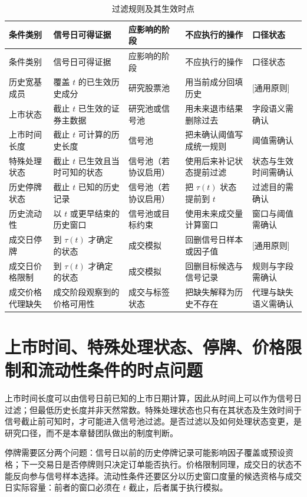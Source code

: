{
\setlength{\tabcolsep}{3.2pt}
\small
\begin{longtable}{p{2.35cm} p{2.75cm} p{2.65cm} p{2.8cm} p{3.55cm}}
\caption{过滤规则及其生效时点}\label{tab:ch03-filter-timing}\\
\toprule
条件类别 & 信号日可得证据 & 应影响的阶段 & 不应执行的操作 & 口径状态 \\
\midrule
\endfirsthead
\toprule
条件类别 & 信号日可得证据 & 应影响的阶段 & 不应执行的操作 & 口径状态 \\
\midrule
\endhead
历史宽基成员 & 覆盖 \(t\) 的已生效历史成分 & 研究股票池 & 用当前成分回填历史 & [通用原则] \\
上市状态 & 截止 \(t\) 已生效的证券主数据 & 研究池或信号池 & 用未来退市结果删除过去 & 字段语义需确认 \\
上市时间长度 & 截止 \(t\) 可计算的历史长度 & 信号池 & 把未确认阈值写成统一规则 & 阈值需确认 \\
特殊处理状态 & 截止 \(t\) 已生效且当时可知的状态 & 信号池（若协议启用） & 使用后来补记状态提前过滤 & 状态与生效时间需确认 \\
历史停牌状态 & 截止 \(t\) 已知的历史记录 & 信号池（若协议启用） & 把 \(\tau(t)\) 状态提前到 \(t\) & 过滤目的需确认 \\
历史流动性 & 以 \(t\) 或更早结束的历史窗口 & 信号池或目标约束 & 使用未来成交量计算窗口 & 窗口与阈值需确认 \\
成交日停牌 & 到 \(\tau(t)\) 才确定的状态 & 成交模拟 & 回删信号日样本或因子值 & [通用原则] \\
成交日价格限制 & 到 \(\tau(t)\) 才确定的状态 & 成交模拟 & 回删目标候选与信号记录 & 规则与字段需确认 \\
成交价格代理缺失 & 成交阶段观察到的价格可用性 & 成交与标签状态 & 把缺失解释为历史不存在 & 代理与缺失语义需确认 \\
\bottomrule
\end{longtable}
}

\section{上市时间、特殊处理状态、停牌、价格限制和流动性条件的时点问题}

上市时间长度可以由信号日前已知的上市日期计算，因此从时间上可以作为信号日过滤；但最低历史长度并非天然常数。特殊处理状态也只有在其状态及生效时间于信号截止前可知时，才可能进入信号池过滤。是否过滤以及如何处理状态变更，是研究口径，而不是本章替团队做出的制度判断。

停牌需要区分两个问题：信号日以前的历史停牌记录可能影响因子覆盖或预设资格；下一交易日是否停牌则只决定订单能否执行。价格限制同理，成交日的状态不能反向参与信号样本选择。流动性条件还要区分以历史窗口度量的候选资格与成交日实际容量：前者的窗口必须在 \(t\) 截止，后者属于执行模拟。

